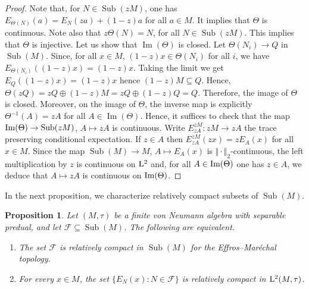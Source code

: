 \documentclass[12pt]{amsart} %
\theoremstyle{plain}
\newtheorem{proposition}[theorem]{Proposition}
\theoremstyle{definition}
\newcommand{\LL}{{\rm L}}
\DeclareMathOperator{\Sub}{Sub}
\begin{document}
\begin{proof}
Note that, for $N\in\Sub(zM)$, one has $E_{\Theta(N)}(a)=E_N(za)+(1-z)a$ for all $a\in M$. It implies that $\Theta$ is continuous. Note also that $z\Theta(N)=N$, for all $N\in\Sub(zM)$. This implies that $\Theta$ is injective. Let us show that $\operatorname{Im}(\Theta)$ is closed. Let $ \Theta(N_i)\to Q$ in $\Sub(M)$. Since, for all $x\in M$, $(1-z)x\in \Theta(N_i)$ for all $i$, we have $E_{\Theta(N_i)}((1-z)x)=(1-z)x$. Taking the limit we get  $E_Q((1-z)x)=(1-z)x$ hence $(1-z)M\subseteq Q$. Hence,
$\Theta(zQ)=zQ\oplus (1-z)M= zQ\oplus (1-z)Q=Q$. Therefore, the image of \(\Theta\) is closed. Moreover, on the image of \(\Theta\), the inverse map is explicitly $\Theta^{-1}(A)=zA$ for all $A\in \operatorname{Im}(\Theta)$. Hence, it suffices to check that the map ${\rm Im}(\Theta)\to\Sub(zM)$, $A\mapsto zA$ is continuous. Write $E^{zM}_{zA}:zM\to zA$ the trace preserving conditional expectation. If $z\in A$ then $E^{zM}_{zA}(zx)=zE_A(x)$ for all $x\in M$. Since the map $\Sub(M)\to M$, $A\mapsto E_A(x)$ is $\Vert\cdot\Vert_2$-continuous, the left multiplication by $z$ is continuous on ${\rm L}^2$ and, for all $A\in{\rm Im}(\Theta)$ one has $z\in A$, we deduce that $A\mapsto zA$ is continuous on ${\rm Im}(\Theta)$.\end{proof}
\noindent In the next proposition, we characterize relatively compact subsets of $\Sub(M)$.
\begin{proposition}
\label{prop:relative-compactness-subalgebras}
Let $(M,\tau)$ be a finite von Neumann algebra with separable predual, and let
$\mathcal F\subseteq\Sub(M)$. The following are equivalent.
\begin{enumerate}
\item The set $\mathcal F$ is relatively compact in $\Sub(M)$ for the
Effros--Mar\'echal topology.
\item For every $x\in M$, the set $\{E_N(x):N\in\mathcal F\}$ is relatively compact in $\LL^2(M,\tau)$.
\end{enumerate}
\end{proposition}
\end{document}
